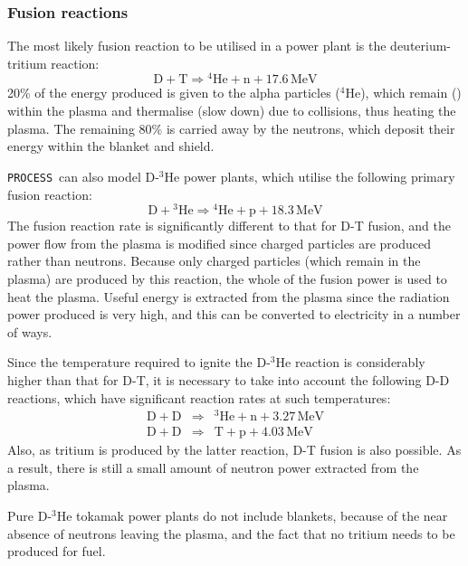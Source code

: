 \documentclass[11pt,a4paper]{report}
\newcommand{\process}{\mbox{\texttt{PROCESS}}}
\begin{document}
\subsubsection{Fusion reactions}
\label{sec:fusion_reactions}

The most likely fusion reaction to be utilised in a power plant is the
deuterium-tritium reaction:
\begin{equation}
\mathrm{D + T} \Longrightarrow \mathrm{^{4}He + n + 17.6 \,MeV}
\label{eqn:d-t}
\end{equation}
20\% of the energy produced is given to the alpha particles ($^4$He), which
remain () within the plasma and thermalise (slow down)
due to collisions, thus heating the plasma. The remaining 80\% is carried away
by the neutrons, which deposit their energy within the blanket and shield.

\process\ can also model D-$^3$He power plants, which utilise the following primary
fusion reaction:
\begin{equation}
\mathrm{D + \mbox{$^3$He}} \Longrightarrow \mathrm{^{4}He + p + 18.3 \,MeV}
\label{eqn:dhe3}
\end{equation}
The fusion reaction rate is significantly different to that for D-T fusion,
and the power flow from the plasma is modified since charged particles are
produced rather than neutrons. Because only charged particles (which remain in
the plasma) are produced by this reaction, the whole of the fusion power is
used to heat the plasma. Useful energy is extracted from the plasma since the
radiation power produced is very high, and this can be converted to
electricity in a number of ways.

Since the temperature required to ignite the D-$^3$He reaction is considerably
higher than that for D-T, it is necessary to take into account the following
D-D reactions, which have significant reaction rates at such temperatures:
\begin{eqnarray}
\mathrm{D + D} & \Longrightarrow & \mathrm{^{3}He + n + 3.27 \,MeV} \\
\mathrm{D + D} & \Longrightarrow & \mathrm{T + p + 4.03 \,MeV}
\end{eqnarray}
Also, as tritium is produced by the latter reaction, D-T fusion is also
possible. As a result, there is still a small amount of neutron power
extracted from the plasma.

Pure D-$^3$He tokamak power plants do not include blankets, because of the near
absence of neutrons leaving the plasma, and the fact that no tritium needs to
be produced for fuel.
\end{document}
